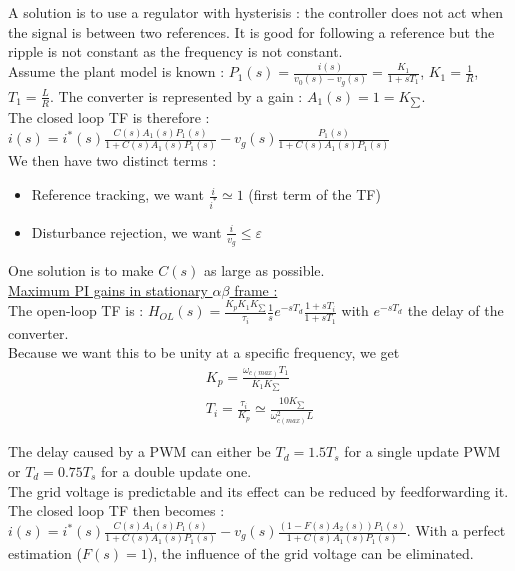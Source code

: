 \documentclass[../main.tex]{subfiles}
\begin{document}
A solution is to use a regulator with hysterisis : the controller does not act when the signal is between two references. It is good for following a reference but the ripple is not constant as the frequency is not constant.\\

Assume the plant model is known : $P_1(s) = \frac{i(s)}{v_0(s) - v_g(s)} = \frac{K_1}{1+sT_1}$, $K_1 = \frac{1}{R}$, $T_1 = \frac{L}{R}$. The converter is represented by a gain : $A_1(s) = 1 = K_{\sum}$.\\

The closed loop TF is therefore : $i(s) = i^*(s) \frac{C(s) A_1(s) P_1(s)}{1+ C(s) A_1(s) P_1(s)} - v_g(s) \frac{P_1(s)}{1+C(s) A_1(s) P_1(s)}$\\

We then have two distinct terms : \begin{itemize}
    \item Reference tracking, we want $\frac{i}{i^*} \simeq 1$ (first term of the TF)
    \item Disturbance rejection, we want $\frac{i}{v_g} \leq \varepsilon$
\end{itemize}
One solution is to make $C(s)$ as large as possible.\\

\quad \underline{Maximum PI gains in stationary $\alpha \beta$ frame :}\\
The open-loop TF is : $H_{OL}(s) = \frac{K_p K_1 K_{\sum}}{\tau_i} \frac{1}{s} e^{-sT_d} \frac{1+sT_i}{1+sT_1}$ with $e^{-sT_d}$ the delay of the converter.\\
Because we want this to be unity at a specific frequency, we get \begin{equation}
    \begin{gathered}
        K_p = \frac{\omega_{c(max)} T_1}{K_1 K_{\sum}}\\
        T_i = \frac{\tau_i}{K_p} \simeq \frac{10 K_{\sum}}{\omega_{c(max)}^2 L}
    \end{gathered}
\end{equation}

The delay caused by a PWM can either be $T_d = 1.5 T_s$ for a single update PWM or $T_d = 0.75 T_s$ for a double update one.\\

\warning The grid voltage is predictable and its effect can be reduced by feedforwarding it. The closed loop TF then becomes : $i(s) = i^*(s) \frac{C(s) A_1(s) P_1(s)}{1+ C(s) A_1(s) P_1(s)} - v_g(s) \frac{(1-F(s) A_2(s))P_1(s)}{1+C(s) A_1(s) P_1(s)}$. With a perfect estimation ($F(s) = 1$), the influence of the grid voltage can be eliminated.
\end{document}
